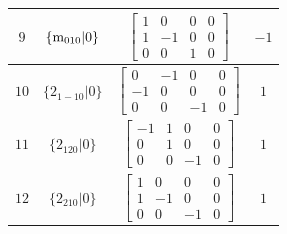 \documentclass[fleqn,8pt]{jsarticle}
\begin{document}
\begin{longtable}{cccc}
$ 9 $ & $ \{{\rm m}_{010}|0\} $ & $ \begin{bmatrix} 1 & 0 & 0 & 0 \\ 1 & -1 & 0 & 0 \\ 0 & 0 & 1 & 0 \end{bmatrix} $ & $ -1 $ \\ \hline
$ 10 $ & $ \{2{}_{1-10}|0\} $ & $ \begin{bmatrix} 0 & -1 & 0 & 0 \\ -1 & 0 & 0 & 0 \\ 0 & 0 & -1 & 0 \end{bmatrix} $ & $ 1 $ \\ \hline
$ 11 $ & $ \{2{}_{120}|0\} $ & $ \begin{bmatrix} -1 & 1 & 0 & 0 \\ 0 & 1 & 0 & 0 \\ 0 & 0 & -1 & 0 \end{bmatrix} $ & $ 1 $ \\ \hline
$ 12 $ & $ \{2{}_{210}|0\} $ & $ \begin{bmatrix} 1 & 0 & 0 & 0 \\ 1 & -1 & 0 & 0 \\ 0 & 0 & -1 & 0 \end{bmatrix} $ & $ 1 $ \\
\end{longtable}
\end{document}
